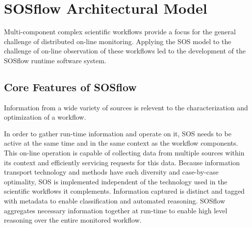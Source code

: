 
\section{SOSflow Architectural Model}
%
%
Multi-component complex scientific workflows provide a focus for the
general challenge of distributed on-line monitoring.
%
Applying the SOS model to the challenge of on-line observation of
these workflows led to the development of the SOSflow runtime software
system.
%
\subsection{Core Features of SOSflow}
%
%
%
%
%
%
%
%
%
Information from a wide variety of sources is relevent to the
characterization and optimization of a workflow.
%
\par
%
In order to gather run-time information and operate on it, SOS needs
to be active at the same time and in the same context as the workflow
components.
%
This on-line operation is capable of collecting data from multiple
sources within its context and efficiently servicing requests
for this data.
%
Because information transport technology and methods have such
diversity and case-by-case optimality, SOS is implemented
independent of the technology used in the scientific workflows it
complements.
%
Information captured is distinct and tagged with metadata to enable
classification and automated reasoning.
%
SOSflow aggregates necessary information together at run-time to
enable high level reasoning over the entire monitored workflow.
%
%
%
